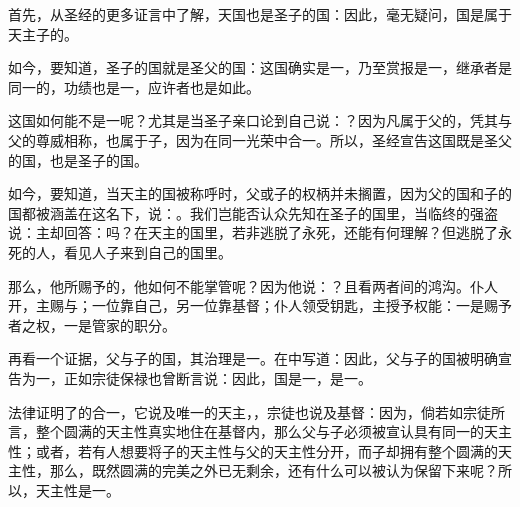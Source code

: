 首先，从圣经的更多证言中了解，天国也是圣子的国：因此，毫无疑问，国是属于天主子的。\par

如今，要知道，圣子的国就是圣父的国：这国确实是一，乃至赏报是一，继承者是同一的，功绩也是一，应许者也是如此。\par

这国如何能不是一呢？尤其是当圣子亲口论到自己说：？因为凡属于父的，凭其与父的尊威相称，也属于子，因为在同一光荣中合一。所以，圣经宣告这国既是圣父的国，也是圣子的国。\par

如今，要知道，当天主的国被称呼时，父或子的权柄并未搁置，因为父的国和子的国都被涵盖在这名下，说：。我们岂能否认众先知在圣子的国里，当临终的强盗说：主却回答：吗？在天主的国里，若非逃脱了永死，还能有何理解？但逃脱了永死的人，看见人子来到自己的国里。\par

那么，他所赐予的，他如何不能掌管呢？因为他说：？且看两者间的鸿沟。仆人开，主赐与；一位靠自己，另一位靠基督；仆人领受钥匙，主授予权能：一是赐予者之权，一是管家的职分。\par

再看一个证据，父与子的国，其治理是一。在中写道：因此，父与子的国被明确宣告为一，正如宗徒保禄也曾断言说：因此，国是一，是一。\par

法律证明了的合一，它说及唯一的天主，，宗徒也说及基督：因为，倘若如宗徒所言，整个圆满的天主性真实地住在基督内，那么父与子必须被宣认具有同一的天主性；或者，若有人想要将子的天主性与父的天主性分开，而子却拥有整个圆满的天主性，那么，既然圆满的完美之外已无剩余，还有什么可以被认为保留下来呢？所以，天主性是一。\par

